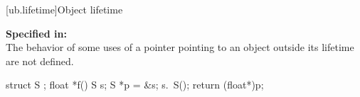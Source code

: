 
[ub.lifetime]{Object lifetime}

\pnum
\textbf{Specified in:}  \\
The behavior of some uses of a pointer
pointing to an object outside its lifetime
are not defined.

\pnum
\begin{example}
\begin{codeblock}
struct S {};
float *f() {
  S s;
  S *p = &s;
  s.~S();
  return (float*)p;
}
\end{codeblock}
\end{example}
